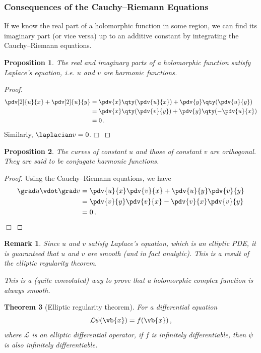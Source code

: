 \documentclass{article}
\theoremstyle{plain}\theoremheaderfont{\normalfont\itshape}\theorembodyfont{\rmfamily}\theoremseparator{.}\newtheorem*{rem}{Remark}\newtheorem*{ex}{Example}\newtheorem*{proof}{Proof}\newtheorem*{altp}{Alternative proof}
\theoremstyle{plain}\theoremheaderfont{\normalfont\bfseries}\theorembodyfont{\rmfamily}\theoremseparator{.}\newtheorem{thm}{Theorem}[section]\newtheorem{lem}[thm]{Lemma}\newtheorem{prop}[thm]{Proposition}\newtheorem*{cor}{Corollary}\newtheorem{defn}[thm]{Definition}\newtheorem{clm}[thm]{Claim}\newtheorem{clminproof}{Claim}
\theoremstyle{break}\theoremheaderfont{\normalfont\itshape}\theorembodyfont{\rmfamily}\theoremseparator{.\medskip}\newtheorem*{proofskip}{Proof}\newtheorem*{exs}{Examples}\newtheorem*{rems}{Remarks}
\theoremstyle{break}\theoremheaderfont{\normalfont\bfseries}\theorembodyfont{\rmfamily}\theoremseparator{.\medskip}\newtheorem{lemskip}[thm]{Lemma}\newtheorem{defnskip}[thm]{Definition}\newtheorem{propskip}[thm]{Proposition}\newtheorem{thmskip}[thm]{Theorem}
\numberwithin{equation}{section}
\newcommand{\qed}{\hfill\ensuremath{\Box}}
\begin{document}
	\subsubsection{Consequences of the Cauchy--Riemann Equations}
	If we know the real part of a holomorphic function in some region, we can find its imaginary part (or vice versa) up to an additive constant by integrating the Cauchy--Riemann equations.
	\begin{prop}
		The real and imaginary parts of a holomorphic function satisfy Laplace's equation, i.e. \(u\) and \(v\) are \textit{harmonic functions}.
	\end{prop}
	\begin{proof}
		\begin{align*}
			\pdv[2]{u}{x}+\pdv[2]{u}{y}&=\pdv{x}\qty(\pdv{u}{x})+\pdv{y}\qty(\pdv{u}{y})\\
			&=\pdv{x}\qty(\pdv{v}{y})+\pdv{y}\qty(-\pdv{u}{x})\\
			&=0\,.
		\end{align*}
		Similarly, \(\laplacian v=0\).\qed
	\end{proof}
	\begin{prop}
		The curves of constant \(u\) and those of constant \(v\) are orthogonal. They are said to be \textit{conjugate harmonic functions}.
	\end{prop}
	\begin{proof}
		Using the Cauchy--Riemann equations, we have
		\begin{align*}
			\grad u\vdot\grad v&=\pdv{u}{x}\pdv{v}{x}+\pdv{u}{y}\pdv{v}{y}\\
			&=\pdv{v}{y}\pdv{v}{x}-\pdv{v}{x}\pdv{v}{y}\\
			&=0\,.
		\end{align*}\qed
	\end{proof}
	\begin{rem}
		Since \(u\) and \(v\) satisfy Laplace's equation, which is an elliptic PDE, it is guaranteed that \(u\) and \(v\) are smooth (and in fact analytic). This is a result of the elliptic regularity theorem.

		This is a (quite convoluted) way to prove that a holomorphic complex function is always smooth.
	\end{rem}
	\begin{thm}[Elliptic regularity theorem]
		For a differential equation
		\[\mathcal{L}\psi(\vb{x})=f(\vb{x})\,,\]
		where \(\mathcal{L}\) is an elliptic differential operator, if \(f\) is infinitely differentiable, then \(\psi\) is also infinitely differentiable.	
	\end{thm}
	
\end{document}
